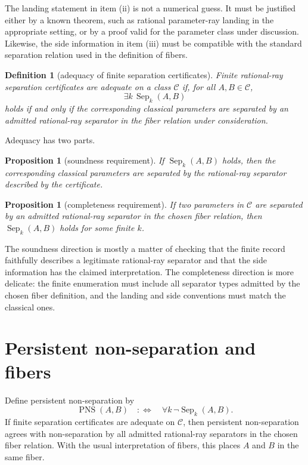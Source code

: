 \documentclass[11pt]{amsart}
\newtheorem{proposition}[theorem]{Proposition}
\newtheorem{definition}[theorem]{Definition}
\begin{document}
The landing statement in item (ii) is not a numerical guess.  It must be justified either by a known theorem, such as rational parameter-ray landing in the appropriate setting, or by a proof valid for the parameter class under discussion.  Likewise, the side information in item (iii) must be compatible with the standard separation relation used in the definition of fibers.

\begin{definition}[adequacy of finite separation certificates]
Finite rational-ray separation certificates are adequate on a class \(\mathcal C\) if, for all \(A,B\in\mathcal C\),
\[
        \exists k\,\operatorname{Sep}_k(A,B)
\]
holds if and only if the corresponding classical parameters are separated by an admitted rational-ray separator in the fiber relation under consideration.
\end{definition}

Adequacy has two parts.

\begin{proposition}[soundness requirement]
If \(\operatorname{Sep}_k(A,B)\) holds, then the corresponding classical parameters are separated by the rational-ray separator described by the certificate.
\end{proposition}

\begin{proposition}[completeness requirement]
If two parameters in \(\mathcal C\) are separated by an admitted rational-ray separator in the chosen fiber relation, then \(\operatorname{Sep}_k(A,B)\) holds for some finite \(k\).
\end{proposition}

The soundness direction is mostly a matter of checking that the finite record faithfully describes a legitimate rational-ray separator and that the side information has the claimed interpretation.  The completeness direction is more delicate: the finite enumeration must include all separator types admitted by the chosen fiber definition, and the landing and side conventions must match the classical ones.

\section{Persistent non-separation and fibers}

Define persistent non-separation by
\[
        \operatorname{PNS}(A,B) \quad:\Longleftrightarrow\quad
        \forall k\,\neg\operatorname{Sep}_k(A,B).
\]
If finite separation certificates are adequate on \(\mathcal C\), then persistent non-separation agrees with non-separation by all admitted rational-ray separators in the chosen fiber relation.  With the usual interpretation of fibers, this places \(A\) and \(B\) in the same fiber.
\end{document}
